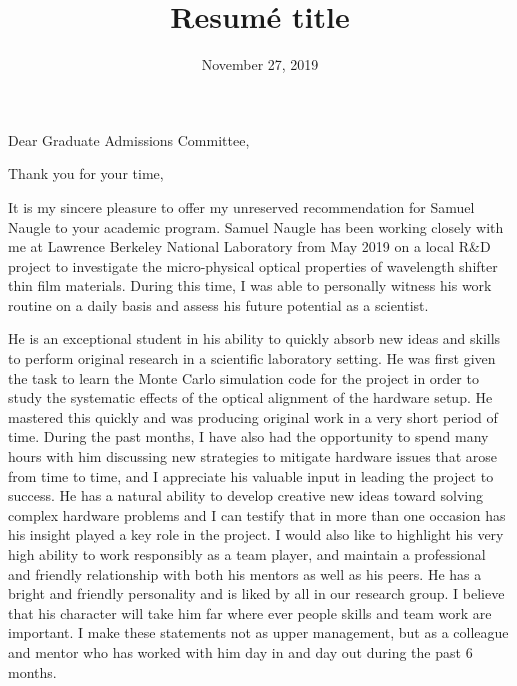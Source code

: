 \documentclass[11pt]{moderncv}        %
\title{Resumé title}                               %
\begin{document}
\date{November 27, 2019}
\opening{Dear Graduate Admissions Committee,}
\closing{Thank you for your time,}
\makelettertitle

\justifying
It is my sincere pleasure to offer my unreserved recommendation for Samuel
Naugle to your academic program. Samuel Naugle has been working closely with me
at Lawrence Berkeley National Laboratory from May 2019 on a local R\&D project
to investigate the micro-physical optical properties of wavelength shifter thin
film materials. During this time, I was able to personally witness his work
routine on a daily basis and assess his future potential as a scientist.

He is an exceptional student in his ability to quickly absorb new ideas and
skills to perform original research in a scientific laboratory setting. He was
first given the task to learn the Monte Carlo simulation code for the project
in order to study the systematic effects of the optical alignment of the
hardware setup. He mastered this quickly and was producing original work in a
very short period of time. During the past months, I have also had the opportunity
to spend many hours with him discussing new strategies to mitigate hardware
issues that arose from time to time, and I appreciate his valuable input in
leading the project to success. He has a natural ability to develop creative
new ideas toward solving complex hardware problems and I can testify that in
more than one occasion has his insight played a key role in the project. I
would also like to highlight his very high ability to work responsibly as a
team player, and maintain a professional and friendly relationship with both
his mentors as well as his peers. He has a bright and friendly personality and
is liked by all in our research group. I believe that his character will take
him far where ever people skills and team work are important. I make these
statements not as upper management, but as a colleague and mentor who has
worked with him day in and day out during the past 6 months.
\end{document}
